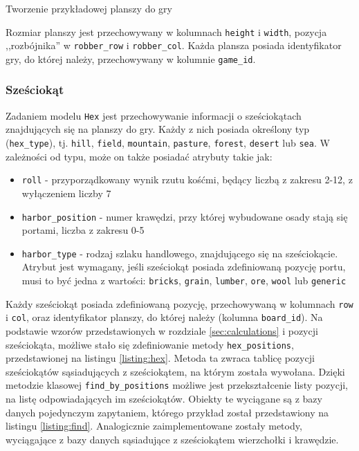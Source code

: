 \documentclass[a4paper,12pt]{article}
\begin{document}
\begin{listing}
  
  \caption{Tworzenie przykładowej planszy do gry}
  \label{listing:board}
\end{listing}

Rozmiar planszy jest przechowywany w kolumnach \texttt{height} i
\texttt{width}, pozycja ,,rozbójnika'' w \texttt{robber\_row} i
\texttt{robber\_col}. Każda plansza posiada identyfikator gry, do
której należy, przechowywany w kolumnie \texttt{game\_id}.

\subsubsection{Sześciokąt}
Zadaniem modelu \texttt{Hex} jest przechowywanie informacji o
sześciokątach znajdujących się na planszy do gry. Każdy z nich posiada
określony typ (\texttt{hex\_type}), tj. \texttt{hill}, \texttt{field},
\texttt{mountain}, \texttt{pasture}, \texttt{forest}, \texttt{desert}
lub \texttt{sea}. W zależności od typu, może on także posiadać
atrybuty takie jak:

\begin{itemize}
\item \texttt{roll} - przyporządkowany wynik rzutu kośćmi, będący
  liczbą z zakresu 2-12, z wyłączeniem liczby 7
\item \texttt{harbor\_position} - numer krawędzi, przy której
  wybudowane osady stają się portami, liczba z zakresu 0-5
\item \texttt{harbor\_type} - rodzaj szlaku handlowego, znajdującego
  się na sześciokącie. Atrybut jest wymagany, jeśli sześciokąt posiada
  zdefiniowaną pozycję portu, musi to być jedna z wartości:
  \texttt{bricks}, \texttt{grain}, \texttt{lumber}, \texttt{ore},
  \texttt{wool} lub \texttt{generic}
\end{itemize}

Każdy sześciokąt posiada zdefiniowaną pozycję, przechowywaną w
kolumnach \texttt{row} i \texttt{col}, oraz identyfikator planszy, do
której należy (kolumna \texttt{board\_id}). Na podstawie wzorów
przedstawionych w rozdziale \ref{sec:calculations} i pozycji
sześciokąta, możliwe stało się zdefiniowanie metody
\texttt{hex\_positions}, przedstawionej na listingu
\ref{listing:hex}. Metoda ta zwraca tablicę pozycji sześciokątów
sąsiadujących z sześciokątem, na którym została wywołana. Dzięki
metodzie klasowej \texttt{find\_by\_positions} możliwe jest
przekształcenie listy pozycji, na listę odpowiadających im
sześciokątów. Obiekty te wyciągane są z bazy danych pojedynczym
zapytaniem, którego przykład został przedstawiony na listingu
\ref{listing:find}. Analogicznie zaimplementowane zostały metody,
wyciągające z bazy danych sąsiadujące z sześciokątem wierzchołki i
krawędzie.
\end{document}
